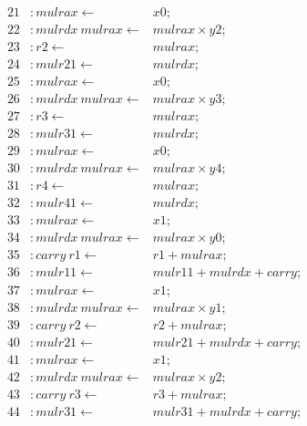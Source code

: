 {\begin{align*}
21 &: \mathit{mulrax} \leftarrow & \mathit{x0}; \\
22 &: \mathit{mulrdx}\ \mathit{mulrax} \leftarrow & \mathit{mulrax} \times \mathit{y2}; \\
23 &: \mathit{r2} \leftarrow & \mathit{mulrax}; \\
24 &: \mathit{mulr21} \leftarrow & \mathit{mulrdx}; \\
25 &: \mathit{mulrax} \leftarrow & \mathit{x0}; \\
26 &: \mathit{mulrdx}\ \mathit{mulrax} \leftarrow & \mathit{mulrax} \times \mathit{y3}; \\
27 &: \mathit{r3} \leftarrow & \mathit{mulrax}; \\
28 &: \mathit{mulr31} \leftarrow & \mathit{mulrdx}; \\
29 &: \mathit{mulrax} \leftarrow & \mathit{x0}; \\
30 &: \mathit{mulrdx}\ \mathit{mulrax} \leftarrow & \mathit{mulrax} \times \mathit{y4}; \\
31 &: \mathit{r4} \leftarrow & \mathit{mulrax}; \\
32 &: \mathit{mulr41} \leftarrow & \mathit{mulrdx}; \\
33 &: \mathit{mulrax} \leftarrow & \mathit{x1}; \\
34 &: \mathit{mulrdx}\ \mathit{mulrax} \leftarrow & \mathit{mulrax} \times \mathit{y0}; \\
35 &: \mathit{carry}\ \mathit{r1} \leftarrow & \mathit{r1} + \mathit{mulrax}; \\
36 &: \mathit{mulr11} \leftarrow & \mathit{mulr11} + \mathit{mulrdx} + \mathit{carry}; \\
37 &: \mathit{mulrax} \leftarrow & \mathit{x1}; \\
38 &: \mathit{mulrdx}\ \mathit{mulrax} \leftarrow & \mathit{mulrax} \times \mathit{y1}; \\
39 &: \mathit{carry}\ \mathit{r2} \leftarrow & \mathit{r2} + \mathit{mulrax}; \\
40 &: \mathit{mulr21} \leftarrow & \mathit{mulr21} + \mathit{mulrdx} + \mathit{carry}; \\
41 &: \mathit{mulrax} \leftarrow & \mathit{x1}; \\
42 &: \mathit{mulrdx}\ \mathit{mulrax} \leftarrow & \mathit{mulrax} \times \mathit{y2}; \\
43 &: \mathit{carry}\ \mathit{r3} \leftarrow & \mathit{r3} + \mathit{mulrax}; \\
44 &: \mathit{mulr31} \leftarrow & \mathit{mulr31} + \mathit{mulrdx} + \mathit{carry}; \\

\end{align*}}

